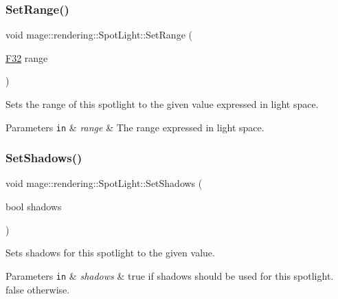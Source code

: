 \subsubsection{\texorpdfstring{Set\+Range()}{SetRange()}}
{\footnotesize\ttfamily void mage\+::rendering\+::\+Spot\+Light\+::\+Set\+Range (\begin{DoxyParamCaption}\item[{\hyperlink{namespacemage_aa97e833b45f06d60a0a9c4fc22ae02c0}{F32}}]{range }\end{DoxyParamCaption})\hspace{0.3cm}{\ttfamily [noexcept]}}

Sets the range of this spotlight to the given value expressed in light space.


\begin{DoxyParams}[1]{Parameters}
\mbox{\tt in}  & {\em range} & The range expressed in light space. \\
\hline
\end{DoxyParams}
\hypertarget{classmage_1_1rendering_1_1_spot_light_af1f1d3aee8bdcda50d16f4b0551e4728}{}\label{classmage_1_1rendering_1_1_spot_light_af1f1d3aee8bdcda50d16f4b0551e4728} 
\subsubsection{\texorpdfstring{Set\+Shadows()}{SetShadows()}}
{\footnotesize\ttfamily void mage\+::rendering\+::\+Spot\+Light\+::\+Set\+Shadows (\begin{DoxyParamCaption}\item[{bool}]{shadows }\end{DoxyParamCaption})\hspace{0.3cm}{\ttfamily [noexcept]}}

Sets shadows for this spotlight to the given value.


\begin{DoxyParams}[1]{Parameters}
\mbox{\tt in}  & {\em shadows} & {\ttfamily true} if shadows should be used for this spotlight. {\ttfamily false} otherwise. \\
\hline
\end{DoxyParams}
\hypertarget{classmage_1_1rendering_1_1_spot_light_a01db83a4c9e64ff48dc4152359abec84}{}\label{classmage_1_1rendering_1_1_spot_light_a01db83a4c9e64ff48dc4152359abec84} 
